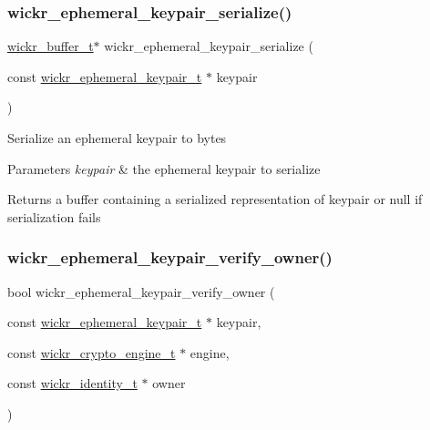 \subsubsection{\texorpdfstring{wickr\_ephemeral\_keypair\_serialize()}{wickr\_ephemeral\_keypair\_serialize()}}
{\footnotesize\ttfamily \mbox{\hyperlink{structwickr__buffer}{wickr\+\_\+buffer\+\_\+t}}$\ast$ wickr\+\_\+ephemeral\+\_\+keypair\+\_\+serialize (\begin{DoxyParamCaption}\item[{const \mbox{\hyperlink{structwickr__ephemeral__keypair}{wickr\+\_\+ephemeral\+\_\+keypair\+\_\+t}} $\ast$}]{keypair }\end{DoxyParamCaption})}

Serialize an ephemeral keypair to bytes


\begin{DoxyParams}{Parameters}
{\em keypair} & the ephemeral keypair to serialize \\
\hline
\end{DoxyParams}
\begin{DoxyReturn}{Returns}
a buffer containing a serialized representation of \textquotesingle{}keypair\textquotesingle{} or null if serialization fails 
\end{DoxyReturn}
\mbox{\label{group__wickr__ephemeral__keypair_gadc17110d4c7fa65a9456fae516bf2e5d}} 
\subsubsection{\texorpdfstring{wickr\_ephemeral\_keypair\_verify\_owner()}{wickr\_ephemeral\_keypair\_verify\_owner()}}
{\footnotesize\ttfamily bool wickr\+\_\+ephemeral\+\_\+keypair\+\_\+verify\+\_\+owner (\begin{DoxyParamCaption}\item[{const \mbox{\hyperlink{structwickr__ephemeral__keypair}{wickr\+\_\+ephemeral\+\_\+keypair\+\_\+t}} $\ast$}]{keypair,  }\item[{const \mbox{\hyperlink{structwickr__crypto__engine}{wickr\+\_\+crypto\+\_\+engine\+\_\+t}} $\ast$}]{engine,  }\item[{const \mbox{\hyperlink{structwickr__identity}{wickr\+\_\+identity\+\_\+t}} $\ast$}]{owner }\end{DoxyParamCaption})}

